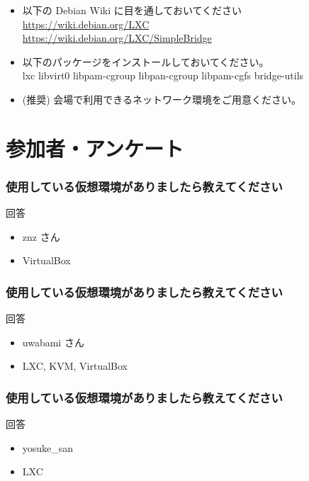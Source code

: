 \documentclass[cjk,dvipdfmx,12pt,compress,%
hyperref={bookmarks=true,bookmarksnumbered=true,bookmarksopen=false,%
colorlinks=false,%
pdftitle={第 120 回 関西 Debian 勉強会},%
pdfauthor={倉敷・のがた・佐々木・かわだ・おおつき},%
pdfsubject={資料},%
}]{beamer}
\begin{document}
\begin{frame}[fragile]
    \begin{itemize}
	\item 以下の Debian Wiki に目を通しておいてください \\
		\url{https://wiki.debian.org/LXC} \\
		\url{https://wiki.debian.org/LXC/SimpleBridge}
    \item 以下のパッケージをインストールしておいてください。 \\
		lxc libvirt0 libpam-cgroup libpan-cgroup libpam-cgfs bridge-utils
	\item (推奨) 会場で利用できるネットワーク環境をご用意ください。
  \end{itemize}
\end{frame}

\section{参加者・アンケート}

\begin{frame}[fragile]
  \frametitle{使用している仮想環境がありましたら教えてください}
  \begin{block}{回答}
	\begin{itemize}
	\item znz さん
	\item VirtualBox
	\end{itemize}
  \end{block}
\end{frame}

\begin{frame}[fragile]
  \frametitle{使用している仮想環境がありましたら教えてください}
  \begin{block}{回答}
	\begin{itemize}
	\item uwabami さん
	\item LXC, KVM, VirtualBox
	\end{itemize}
  \end{block}
\end{frame}

\begin{frame}[fragile]
  \frametitle{使用している仮想環境がありましたら教えてください}
  \begin{block}{回答}
	\begin{itemize}
	\item yosuke\_san
	\item LXC
	\end{itemize}
  \end{block}
\end{frame}
\end{document}
